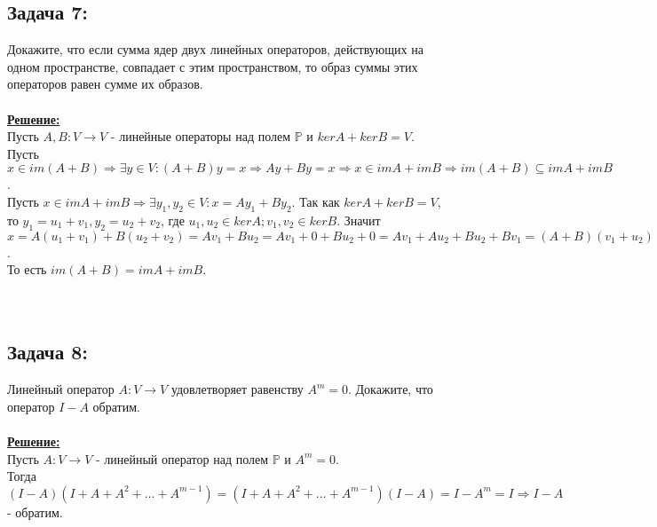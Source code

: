 \documentclass[a4paper,12pt,titlepage,final]{article}
\begin{document}
\subsection*{Задача 7:}
\noindent Докажите, что если сумма ядер двух линейных операторов, действующих на одном пространстве, совпадает с этим пространством,
то образ суммы этих операторов равен сумме их образов. \\ \\
\textbf{\underline{Решение:}} \\
Пусть $A, B: V \rightarrow V$ - линейные операторы над полем $\mathbb{P}$ и $kerA + kerB = V$. \\
Пусть $x \in im(A + B) \Rightarrow \exists y \in V: (A + B)y = x \Rightarrow Ay + By = x \Rightarrow x \in imA + imB
\Rightarrow im(A + B) \subseteq imA + imB$. \\
Пусть $x \in imA + imB \Rightarrow \exists y_1, y_2 \in V: x = Ay_1 + By_2$. Так как $kerA + kerB = V$, то
$y_1 = u_1 + v_1, y_2 = u_2 + v_2$, где $u_1, u_2 \in kerA; v_1, v_2 \in kerB$. Значит $x = A(u_1 + v_1) + B(u_2 + v_2) =
Av_1 + Bu_2 = Av_1 + 0 + Bu_2 + 0 = Av_1 + Au_2 + Bu_2 + Bv_1 = (A + B)(v_1 + u_2) \Rightarrow x \in im(A + B)
\Rightarrow imA + imB \subseteq im(A + B)$.\\
То есть $im(A + B) = imA + imB$. \\ \\ \\


\subsection*{Задача 8:}
\noindent Линейный оператор $A: V \rightarrow V$ удовлетворяет равенству $A^m = 0$. Докажите, что оператор
$I - A$ обратим. \\ \\
\textbf{\underline{Решение:}} \\
Пусть $A: V \rightarrow V$ - линейный оператор над полем $\mathbb{P}$ и $A^m = 0$. \\
Тогда $(I - A)(I + A + A^2 + ... + A^{m-1}) = (I + A + A^2 + ... + A^{m-1})(I - A) = I - A^m = I \Rightarrow I - A$ - обратим. \\ \\ \\


\end{document}
